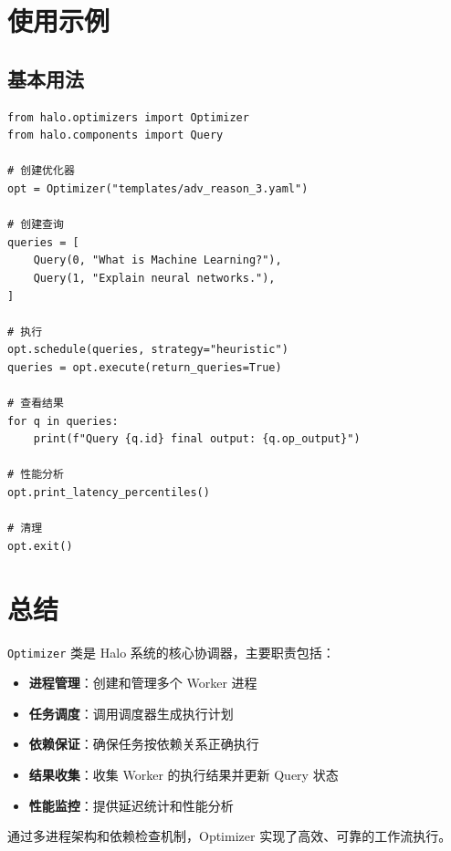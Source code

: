 \documentclass[12pt,a4paper]{article}
\begin{document}
\section{使用示例}

\subsection{基本用法}

\begin{lstlisting}
from halo.optimizers import Optimizer
from halo.components import Query

# 创建优化器
opt = Optimizer("templates/adv_reason_3.yaml")

# 创建查询
queries = [
    Query(0, "What is Machine Learning?"),
    Query(1, "Explain neural networks."),
]

# 执行
opt.schedule(queries, strategy="heuristic")
queries = opt.execute(return_queries=True)

# 查看结果
for q in queries:
    print(f"Query {q.id} final output: {q.op_output}")

# 性能分析
opt.print_latency_percentiles()

# 清理
opt.exit()
\end{lstlisting}

\section{总结}

\texttt{Optimizer} 类是 Halo 系统的核心协调器，主要职责包括：

\begin{itemize}
    \item \textbf{进程管理}：创建和管理多个 Worker 进程
    \item \textbf{任务调度}：调用调度器生成执行计划
    \item \textbf{依赖保证}：确保任务按依赖关系正确执行
    \item \textbf{结果收集}：收集 Worker 的执行结果并更新 Query 状态
    \item \textbf{性能监控}：提供延迟统计和性能分析
\end{itemize}

通过多进程架构和依赖检查机制，Optimizer 实现了高效、可靠的工作流执行。
\end{document}
